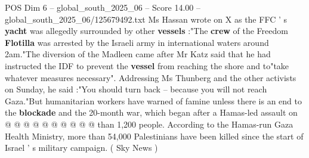 \begin{textsample}{POS Dim 6 – global\_south\_2025\_06 – Score 14.00 – global\_south\_2025\_06/125679492.txt}
Ms Hassan wrote on X as the FFC ' s \textbf{yacht} was allegedly surrounded by other \textbf{vessels} :"The \textbf{crew} of the Freedom \textbf{Flotilla} was arrested by the Israeli army in international waters around 2am."The diversion of the Madleen came after Mr Katz said that he had instructed the IDF to prevent the \textbf{vessel} from reaching the shore and to"take whatever measures necessary".
Addressing Ms Thunberg and the other activists on Sunday, he said :"You should turn back -- because you will not reach Gaza."But humanitarian workers have warned of famine unless there is an end to the \textbf{blockade} and the 20-month war, which began after a Hamas-led assault on @ @ @ @ @ @ @ @ @ @ than 1,200 people.
According to the Hamas-run Gaza Health Ministry, more than 54,000 Palestinians have been killed since the start of Israel ' s military campaign. ( Sky News )

\end{textsample}

